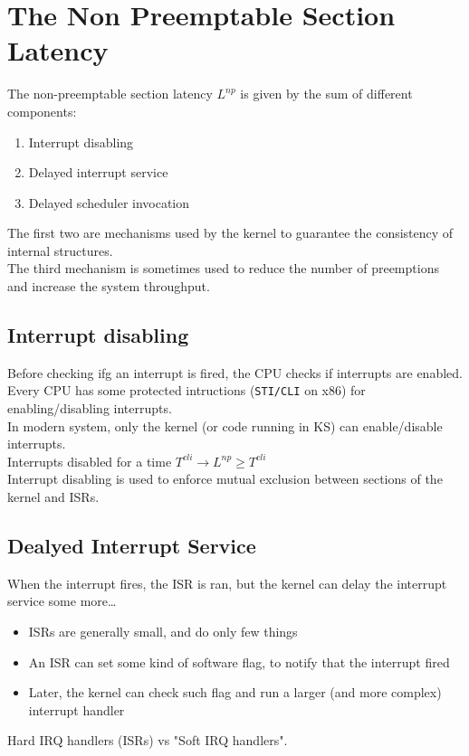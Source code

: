 \chapter{The Non Preemptable Section Latency}


The non-preemptable section latency $L^{np}$ is given by the sum of different components:
\begin{enumerate}
    \item Interrupt disabling
    \item Delayed interrupt service
    \item Delayed scheduler invocation
\end{enumerate}
The first two are mechanisms used by the kernel to guarantee the consistency of internal structures.\\
The third mechanism is sometimes used to reduce the number of preemptions and increase the system throughput.

\section{Interrupt disabling}
Before checking ifg an interrupt is fired, the CPU checks if interrupts are enabled. Every CPU has some protected intructions (\texttt{STI/CLI} on x86) for enabling/disabling interrupts.\\
In modern system, only the kernel (or code running in KS) can enable/disable interrupts.\\
Interrupts disabled for a time $T^{cli} \rightarrow L^{np}\ge T^{cli}$\\
Interrupt disabling is used to enforce mutual exclusion between sections of the kernel and ISRs.
\section{Dealyed Interrupt Service}
When the interrupt fires, the ISR is ran, but the kernel can delay the interrupt service some more\dots
\begin{itemize}
    \item ISRs are generally small, and do only few things
    \item An ISR can set some kind of software flag, to notify that the interrupt fired
    \item Later, the kernel can check such flag and run a larger (and more complex) interrupt handler
\end{itemize}
Hard IRQ handlers (ISRs) vs "Soft IRQ handlers".

